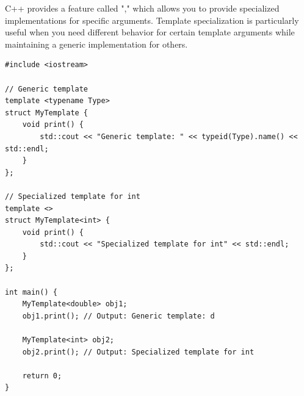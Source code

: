 C++ provides a feature called "," which allows you to provide specialized implementations for specific  arguments. Template specialization is particularly useful when you need different behavior for certain template arguments while maintaining a generic implementation for others.
\begin{lstlisting}
#include <iostream>

// Generic template
template <typename Type>
struct MyTemplate {
    void print() {
        std::cout << "Generic template: " << typeid(Type).name() << std::endl;
    }
};

// Specialized template for int
template <>
struct MyTemplate<int> {
    void print() {
        std::cout << "Specialized template for int" << std::endl;
    }
};

int main() {
    MyTemplate<double> obj1;
    obj1.print(); // Output: Generic template: d

    MyTemplate<int> obj2;
    obj2.print(); // Output: Specialized template for int

    return 0;
}
\end{lstlisting}











\subsubsection{}

